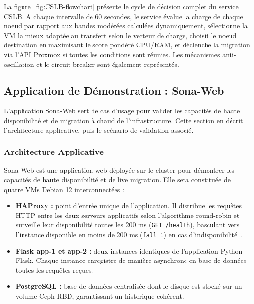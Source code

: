 \par La figure~\ref{fig:CSLB-flowchart} présente le cycle de décision complet du service CSLB. A chaque intervalle de 60 secondes, le service évalue la charge de chaque noeud par rapport aux bandes modérées calculées dynamiquement, sélectionne la VM la mieux adaptée au transfert selon le vecteur de charge, choisit le noeud destination en maximisant le score pondéré CPU/RAM, et déclenche la migration via l'API Proxmox si toutes les conditions sont réunies. Les mécanismes anti-oscillation et le circuit breaker sont également représentés.\\

\subsection{Application de Démonstration : Sona-Web}

\par L'application Sona-Web sert de cas d'usage pour valider les capacités de haute disponibilité et de migration à chaud de l'infrastructure. Cette section en décrit l'architecture applicative, puis le scénario de validation associé.\\

\subsubsection{Architecture Applicative}

\par Sona-Web est une application web déployée sur le cluster pour démontrer les capacités de haute disponibilité et de live migration. Elle sera constituée de quatre VMs Debian 12 interconnectées :

\begin{itemize}
    \item \textbf{HAProxy :} point d'entrée unique de l'application. Il distribue les requêtes HTTP entre les deux serveurs applicatifs selon l'algorithme round-robin et surveille leur disponibilité toutes les 200 ms (\texttt{GET /health}), basculant vers l'instance disponible en moins de 200 ms (\texttt{fall 1}) en cas d'indisponibilité~\cite{ref26}.

    \item \textbf{Flask app-1 et app-2 :} deux instances identiques de l'application Python Flask. Chaque instance enregistre de manière asynchrone en base de données toutes les requêtes reçues.

    \item \textbf{PostgreSQL :} base de données centralisée dont le disque est stocké sur un volume Ceph RBD, garantissant un historique cohérent.
\end{itemize}

